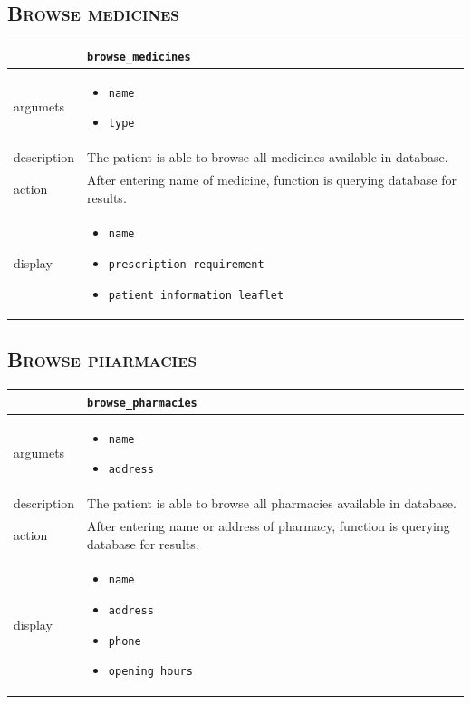 \documentclass[12pt,titlepage]{article}
\begin{document}
\subsection{\textsc{Browse medicines}}

\begin{tabularx}{\textwidth}{ |p{2.5cm}|X| }
	\hline
	 &  \texttt{browse\_medicines}\\
\hline	
argumets & 
\begin{itemize}
\item \texttt{name}
\item \texttt{type}
\end{itemize} \\
\hline
description & The patient is able to browse all medicines available in database.\\
\hline
action & After entering name of medicine, function is querying database for results.\\
\hline
display &
\begin{itemize}
\item \texttt{name}
\item \texttt{prescription requirement}
\item \texttt{patient information leaflet}
\end{itemize}\\
\hline
\end{tabularx}

\subsection{\textsc{Browse pharmacies}}

\begin{tabularx}{\textwidth}{ |p{2.5cm}|X| }
	\hline
	 &  \texttt{browse\_pharmacies}\\
\hline	
argumets & 
\begin{itemize}
\item \texttt{name}
\item \texttt{address}
\end{itemize} \\
\hline
description & The patient is able to browse all pharmacies available in database.\\
\hline
action & After entering name or address of pharmacy, function is querying database for results.\\
\hline
display &
\begin{itemize}
\item \texttt{name}
\item \texttt{address}
\item \texttt{phone}
\item \texttt{opening hours}
\end{itemize}\\
\hline
\end{tabularx}
\end{document}
